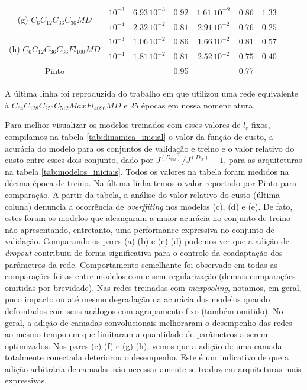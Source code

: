\begin{table}[ht]
\begin{center}
\begin{tabular}{ |c|c|c|c|c|c|c| }
			\hline\hline
			\multirow{2}{*}{(g) $C_6C_{12}C_{36}C_{36}MD$}
			& $10^{-3}$ & $6.93\,10^{-3}$ & $0.92$ & $\mathbf{1.61\,10^{-2}}$ & $\mathbf{0.86}$ & $1.33$ \\ \cline{2-7}
			& $10^{-4}$ & $2.32\,10^{-2}$ & $0.81$ & $2.91\,10^{-2}$ & $0.76$ & $\mathbf{0.25}$ \\ \cline{2-7}
			
			\hline\hline
			\multirow{2}{*}{(h) $C_6C_{12}C_{36}C_{36}Fl_{100}MD$}
			& $10^{-3}$ & $1.06\,10^{-2}$ & $0.86$ & $1.66\,10^{-2}$ & $0.81$ & $0.57$ \\ \cline{2-7}
			& $10^{-4}$ & $1.81\,10^{-2}$ & $0.81$ & $2.52\,10^{-2}$ & $0.75$ & $0.40$ \\ \cline{2-7}
			\hline\hline
			Pinto\cite{otaro} & - & - & 0.95 & - & 0.77 &  - \\ \cline{2-7} \hline
		\end{tabular}\hfill%
	\end{center}
	\small A última linha foi reproduzida do trabalho em \cite{otaro} que utilizou uma rede equivalente à $C_{64}C_{128}C_{256}C_{512}MaxFl_{4096}MD$ e 25 épocas em nossa nomenclatura.
\end{table}

Para melhor visualizar os modelos treinados com esses valores de $l_r$ fixos, compilamos na tabela \ref{tab:dinamica_inicial} o valor da função de custo, a acurácia do modelo para os conjuntos de validação e treino e o valor relativo do custo entre esses dois conjunto, dado por $J^{(D_{val})}/J^{(D_{tr})} - 1$, para as arquiteturas na tabela \ref{tab:modelos_iniciais}. Todos os valores na tabela foram medidos na décima época de treino. Na última linha temos o valor reportado por Pinto para comparação. A partir da tabela, a análise do valor relativo do custo (última coluna) denuncia a ocorrência de \textit{overffiting} nos modelos (c), (d) e (e). De fato, estes foram os modelos que alcançaram a maior acurácia no conjunto de treino não apresentando, entretanto, uma performance expressiva no conjunto de validação. Comparando os pares (a)-(b) e (c)-(d) podemos ver que a adição de \textit{dropout} contribuiu de forma significativa para o controle da coadaptação dos parâmetros da rede. Comportamento semelhante foi observado em todas as comparações feitas entre modelos com e sem regularização (demais comparações omitidas por brevidade). Nas redes treinadas com \textit{maxpooling}, notamos, em geral, puco impacto ou até mesmo degradação na acurácia dos modelos quando defrontados com seus análogos com agrupamento fixo (também omitido). No geral, a adição de camadas convolucionais melhoraram o desempenho das redes ao mesmo tempo em que limitaram a quantidade de parâmetros a serem optimizados. Nos pares (e)-(f) e (g)-(h), vemos que a adição de uma camada totalmente conectada deteriorou o desempenho. Este é um indicativo de que a adição arbitrária de camadas não necessariamente se traduz em arquiteturas mais expressivas.

